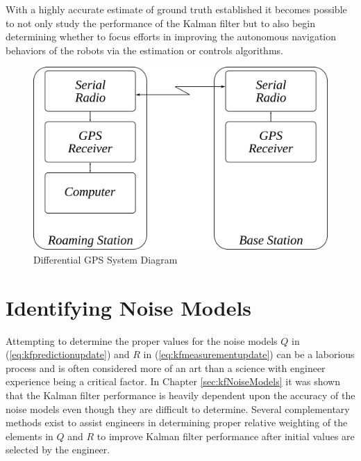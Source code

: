 With a highly accurate estimate of ground truth established it becomes possible to not only study the performance of the Kalman filter but to also begin determining whether to focus efforts in improving the autonomous navigation behaviors of the robots via the estimation or controls algorithms.

\begin{figure}[ht!]
	\centering
	\includegraphics[width=.6\textwidth]{images/dgps}
	\caption{Differential GPS System Diagram}
	\label{fig:dgps}
\end{figure}

\section{Identifying Noise Models}
\label{sec:kfIdentifyNoiseModels}
Attempting to determine the proper values for the noise models $Q$ in (\ref{eq:kfpredictionupdate}) and $R$ in (\ref{eq:kfmeasurementupdate}) can be a laborious process and is often considered more of an art than a science with engineer experience being a critical factor. In Chapter \ref{sec:kfNoiseModels} it was shown that the Kalman filter performance is heavily dependent upon the accuracy of the noise models even though they are difficult to determine. Several complementary methods exist to assist engineers in determining proper relative weighting of the elements in $Q$ and $R$ to improve Kalman filter performance after initial values are selected by the engineer.

